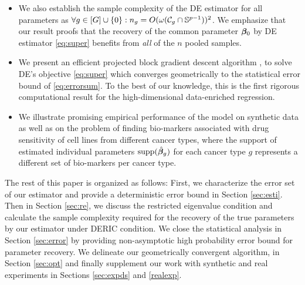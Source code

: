 \begin{itemize}[leftmargin = .4cm]
	\item We also establish the sample complexity of the DE estimator for all parameters as $\forall g \in [G] \cup \{0\}: n_g = O(\omega(\cC_g \cap \sphere))^2$. We emphasize that our result proofs that the recovery of the common parameter $\boldsymbol{\beta}_0$ by DE estimator \eqref{eq:super} benefits from \emph{all} of the $n$ pooled samples.
	\item We present an efficient projected block gradient descent algorithm \emph{\dc}, to solve DE's objective \eqref{eq:super} which converges geometrically to the statistical error bound of \eqref{eq:errorsum}. To the best of our knowledge, this is the first rigorous computational result for the high-dimensional data-enriched regression.
	\item We illustrate promising empirical performance of the model on synthetic data as well as on the problem of finding bio-markers associated with drug sensitivity of cell lines from different cancer types, where the support of estimated individual parameters $\text{supp}(\hat{\boldsymbol{\beta}}_g)$ for each cancer type $g$ represents a different set of bio-markers per cancer type.
\end{itemize}

The rest of this paper is organized as follows:
First, we characterize the error set of our estimator and provide a deterministic error bound in Section \ref{sec:esti}.
Then in Section \ref{sec:re}, we discuss the restricted eigenvalue condition and calculate the sample complexity required for the recovery of the true parameters by our estimator under DERIC condition.
We close the statistical analysis in Section \ref{sec:error} by providing non-asymptotic high probability error bound for parameter recovery.
We delineate our geometrically convergent algorithm, \dc{} in Section \ref{sec:opt} and finally supplement our work with synthetic and real experiments in Sections \ref{sec:expds} and \ref{realexp}.

